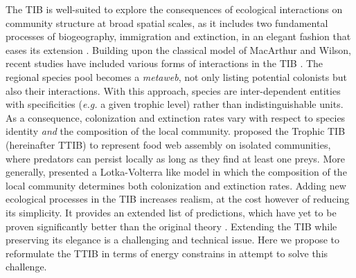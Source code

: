 The TIB is well-suited to explore the consequences of ecological
interactions on community structure at broad spatial scales, as it
includes two fundamental processes of biogeography, immigration and
extinction, in an elegant fashion that eases its extension
\citep{Losos2010, Warren2015}. Building upon the classical model of
MacArthur and Wilson, recent studies have included various forms of
interactions in the TIB \citep{Gravel2011, Cazelles2015a}. The regional
species pool becomes a \emph{metaweb}, not only listing potential
colonists but also their interactions. With this approach, species are
inter-dependent entities with specificities (\emph{e.g.} a given trophic
level) rather than indistinguishable units. As a consequence,
colonization and extinction rates vary with respect to species identity
\emph{and} the composition of the local community. \citet{Gravel2011}
proposed the Trophic TIB (hereinafter TTIB) to represent food web
assembly on isolated communities, where predators can persist locally as
long as they find at least one preys. More generally,
\citet{Cazelles2015} presented a Lotka-Volterra like model in which the
composition of the local community determines both colonization and
extinction rates. Adding new ecological processes in the TIB increases
realism, at the cost however of reducing its simplicity. It provides an
extended list of predictions, which have yet to be proven significantly
better than the original theory \citep[see][]{Cirtwill2015}. Extending
the TIB while preserving its elegance is a challenging and technical
issue. Here we propose to reformulate the TTIB in terms of energy
constrains in attempt to solve this challenge.

